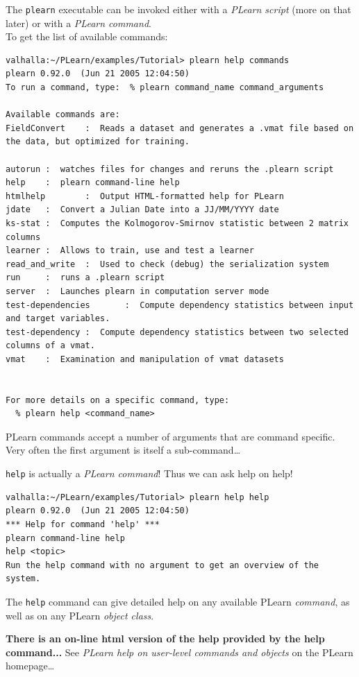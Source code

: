 \documentclass[11pt]{book}
\begin{document}
The {\tt plearn} executable can be invoked either with a {\em PLearn script} (more on that later) or with a {\em PLearn command}.\\
To get the list of available commands:

\begin{verbatim}
valhalla:~/PLearn/examples/Tutorial> plearn help commands
plearn 0.92.0  (Jun 21 2005 12:04:50)
To run a command, type:  % plearn command_name command_arguments

Available commands are:
FieldConvert    :  Reads a dataset and generates a .vmat file based on the data, but optimized for training.

autorun :  watches files for changes and reruns the .plearn script
help    :  plearn command-line help
htmlhelp        :  Output HTML-formatted help for PLearn
jdate   :  Convert a Julian Date into a JJ/MM/YYYY date
ks-stat :  Computes the Kolmogorov-Smirnov statistic between 2 matrix columns
learner :  Allows to train, use and test a learner
read_and_write  :  Used to check (debug) the serialization system
run     :  runs a .plearn script
server  :  Launches plearn in computation server mode
test-dependencies       :  Compute dependency statistics between input and target variables.
test-dependency :  Compute dependency statistics between two selected columns of a vmat.
vmat    :  Examination and manipulation of vmat datasets


For more details on a specific command, type:
  % plearn help <command_name>

\end{verbatim}

PLearn commands accept a number of arguments that are command specific.
Very often the first argument is itself a sub-command\ldots

{\tt help} is actually a {\em PLearn command}! Thus we can ask help on help!

\begin{verbatim}
valhalla:~/PLearn/examples/Tutorial> plearn help help
plearn 0.92.0  (Jun 21 2005 12:04:50)
*** Help for command 'help' ***
plearn command-line help
help <topic>
Run the help command with no argument to get an overview of the system.
\end{verbatim}

The {\tt help} command can give detailed help on any available PLearn {\em
  command}, as well as on any PLearn {\em object class}.

{\bf There is an on-line html version of the help provided by the help command...}
See {\em PLearn help on user-level commands and objects} on the PLearn homepage\ldots
\end{document}
